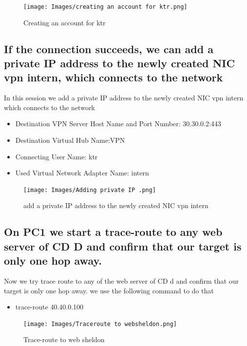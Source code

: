 \begin{figure}[H]
\centering
  \texttt{[image: Images/creating an account for ktr.png]}
  \caption{Creating an account for ktr}
  \label{fig }
\end{figure}


\subsection{If the connection succeeds, we can add a private IP address to the newly created NIC vpn intern, which connects to the network}
In this session we add a private IP address to the newly created NIC vpn intern which connects to the network
\begin{itemize}
\item Destination VPN Server Host Name and Port Number: 30.30.0.2:443
\item Destination Virtual Hub Name:VPN
\item Connecting User Name: ktr
\item Used Virtual Network Adapter Name: intern
\end{itemize}

\begin{figure}[H]
\centering
  \texttt{[image: Images/Adding private IP .png]}
  \caption{add a private IP address to the newly created NIC vpn intern}
  \label{fig }
\end{figure}

\subsection{On PC1 we start a trace-route to any web server of CD D and confirm that our target is only one hop away.
}
Now we try trace route to any of the web server of CD d and confirm that our target is only one hop away.
we use the following command to do that 
\begin{itemize}
    \item trace-route 40.40.0.100
\end{itemize}

\begin{figure}[H]
\centering
  \texttt{[image: Images/Traceroute to websheldon.png]}
  \caption{Trace-route to web sheldon}
  \label{fig }
\end{figure}

